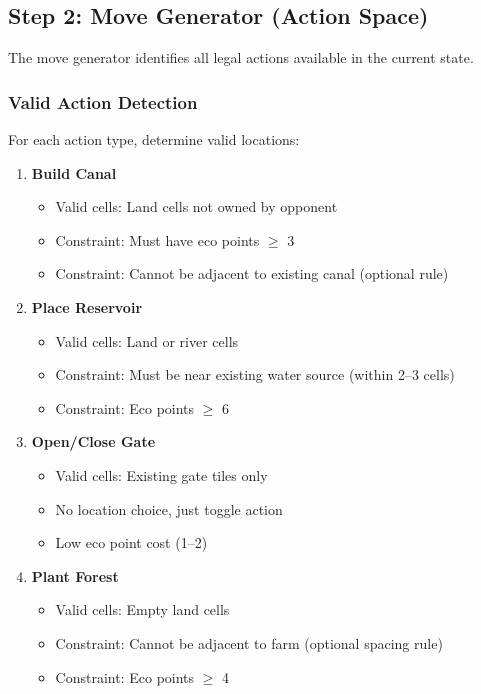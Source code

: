 \documentclass[12pt,a4paper]{article}
\begin{document}
\subsection{Step 2: Move Generator (Action Space)}

The move generator identifies all legal actions available in the current state.

\subsubsection{Valid Action Detection}

For each action type, determine valid locations:

\begin{enumerate}
    \item \textbf{Build Canal}
    \begin{itemize}
        \item Valid cells: Land cells not owned by opponent
        \item Constraint: Must have eco points $\geq$ 3
        \item Constraint: Cannot be adjacent to existing canal (optional rule)
    \end{itemize}
    
    \item \textbf{Place Reservoir}
    \begin{itemize}
        \item Valid cells: Land or river cells
        \item Constraint: Must be near existing water source (within 2--3 cells)
        \item Constraint: Eco points $\geq$ 6
    \end{itemize}
    
    \item \textbf{Open/Close Gate}
    \begin{itemize}
        \item Valid cells: Existing gate tiles only
        \item No location choice, just toggle action
        \item Low eco point cost (1--2)
    \end{itemize}
    
    \item \textbf{Plant Forest}
    \begin{itemize}
        \item Valid cells: Empty land cells
        \item Constraint: Cannot be adjacent to farm (optional spacing rule)
        \item Constraint: Eco points $\geq$ 4
    \end{itemize}
    

\end{enumerate}
\end{document}
